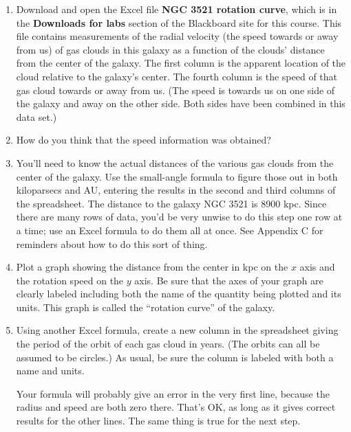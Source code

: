 \begin{enumerate}

\item Download and open the Excel file {\bf NGC 3521 rotation curve},
which is in the {\bf Downloads for labs} section of the Blackboard
site for this course.  This file contains measurements of the
radial velocity (the speed towards or away from us) of gas clouds
in this galaxy as a function of the clouds' distance from the center
of the galaxy.  The first column is the apparent location of the cloud
relative to the galaxy's center.  The fourth column is the speed
of that gas cloud towards or away from us.  (The speed is towards
us on one side of the galaxy and away on the other side.  Both
sides have been combined in this data set.)

\item How do you think that the speed information was obtained?

\answerspace{1in}

\item You'll need to know the actual distances of the various gas clouds
from the center of the galaxy.  Use the small-angle formula to figure
those out in both kiloparsecs and AU, entering the results in the
second and third columns of the spreadsheet.  The distance to the
galaxy NGC 3521 is 8900 kpc.  Since there are many rows of data, you'd
be very unwise to do this step one row at a time; use an Excel formula
to do them all at once.  See Appendix C for reminders about how to do this sort
of thing.

\item Plot a graph showing the distance from the center in kpc on the
$x$ axis and the rotation speed on the $y$ axis.  Be sure that
the axes of your graph are clearly labeled including both the
name of the quantity being plotted and its units.  This graph
is called the ``rotation curve'' of the galaxy.

\item Using another Excel formula, 
create a new column in the spreadsheet giving the period
of the orbit of each gas cloud in years.  (The orbits can
all be assumed to be circles.)  As usual, be sure the column
is labeled with both a name and units.

Your formula will probably give an error in the very first line,
because the radius and speed are both zero there.  That's OK,
as long as it gives correct results for the other lines.  The
same thing is true for the next step.


\end{enumerate}
